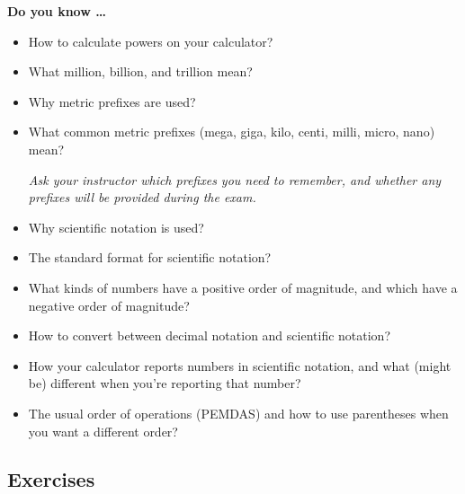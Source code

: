 



\noindent \textbf{Do you know \ldots}

\begin{itemize} 
\item How to calculate powers on your calculator?
\item What  million, billion, and trillion mean?  
\item Why metric prefixes are used?  
\item What common metric prefixes (mega, giga, kilo, centi, milli, micro, nano) mean? 

\emph{Ask your instructor which prefixes you need to remember, and whether any prefixes will be provided during the exam.} 
\item Why scientific notation is used?  
\item The standard format for scientific notation?  
\item What kinds of numbers have a positive order of magnitude, and which have a negative order of magnitude?
\item How to convert between decimal notation and scientific notation?  
\item How your calculator reports numbers in scientific notation, and what (might be) different when you're reporting that number?  
\item The usual order of operations (PEMDAS) and how to use parentheses when you want a different order?
  
\end{itemize}

\subsection*{Exercises}

